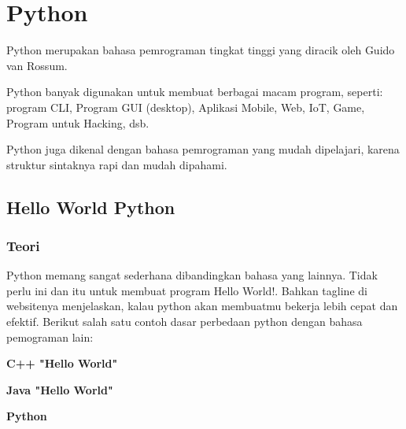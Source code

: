 \chapter{Python}
Python merupakan bahasa pemrograman tingkat tinggi yang diracik oleh Guido van Rossum.

Python banyak digunakan untuk membuat berbagai macam program, seperti: program CLI, Program GUI (desktop), Aplikasi Mobile, Web, IoT, Game, Program untuk Hacking, dsb.

Python juga dikenal dengan bahasa pemrograman yang mudah dipelajari, karena struktur sintaknya rapi dan mudah dipahami.
 \section{Hello World Python}
 \subsection{Teori}
 Python memang sangat sederhana dibandingkan bahasa yang lainnya. Tidak perlu ini dan itu untuk membuat program Hello World!.
Bahkan tagline di websitenya menjelaskan, kalau python akan membuatmu bekerja lebih cepat dan efektif.
Berikut salah satu contoh dasar perbedaan python dengan bahasa pemograman lain:
\par\textbf{C++ "Hello World"}

\par \textbf{Java "Hello World"}

\par \textbf{Python}

